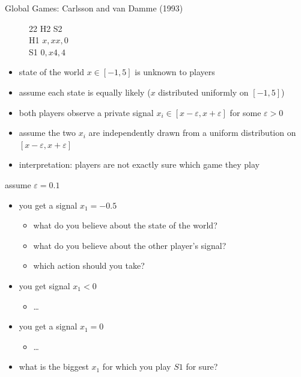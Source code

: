 \documentclass[bigger,allowframebreaks]{beamer}
\begin{document}
\begin{frame}[allowframebreaks,label=]{Global Games: Carlsson and van Damme (1993)}

\begin{figure}[h]
 \centering
 \begin{game}{2}{2}
 \> H2 \> S2\\
 H1   \>$x,x$\>$x,0$\\
 S1 \>$0,x$\>$4,4$
\end{game}
\end{figure}

\begin{itemize}
\item state of the world $x\in[-1,5]$ is unknown to players
\item assume each state is equally likely ($x$ distributed uniformly on $[-1,5]$)
\item both players observe a private signal $x_i\in[x-\varepsilon ,x+\varepsilon ]$ for some $\varepsilon >0$
\item assume the two $x_i$ are independently drawn from a uniform distribution on $[x-\varepsilon ,x+\varepsilon ]$
\item interpretation: players are not exactly sure which game they play
\end{itemize}

\framebreak

assume $\varepsilon=0.1$
\begin{itemize}
\item you get a signal $x_1=-0.5$
\begin{itemize}
\item what do you believe about the state of the world?
\item what do you believe about the other player's signal?
\item which action should you take?
\end{itemize}

\item you get signal $x_1<0$
\begin{itemize}
\item \dots{}
\end{itemize}

\item you get a signal $x_1=0$
\begin{itemize}
\item \dots{}
\end{itemize}

\item what is the biggest $x_1$ for which you play $S1$ for sure?
\end{itemize}


\end{frame}
\end{document}
